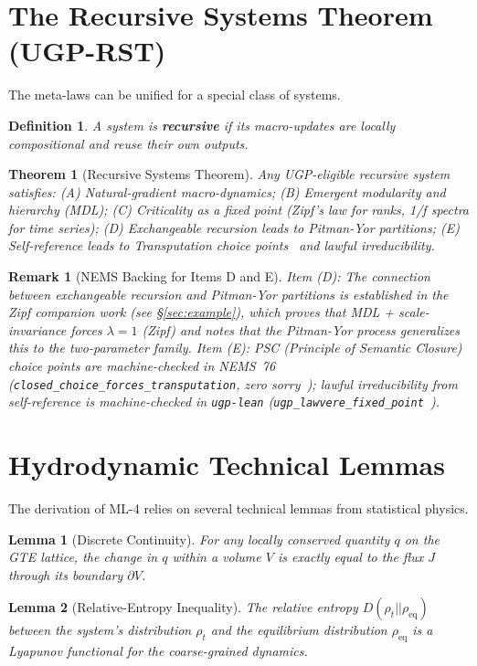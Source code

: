 \documentclass[11pt]{article}
\newtheorem{theorem}{Theorem}[section]
\newtheorem{lemma}{Lemma}[section]
\newtheorem{definition}{Definition}[section]
\newtheorem{remark}{Remark}[section]
\begin{document}
\section{The Recursive Systems Theorem (UGP-RST)}
\label{app:rst}
The meta-laws can be unified for a special class of systems.
\begin{definition}
A system is \textbf{recursive} if its macro-updates are locally compositional and reuse their own outputs.
\end{definition}
\begin{theorem}[Recursive Systems Theorem]
Any UGP-eligible recursive system satisfies: (A) Natural-gradient macro-dynamics; (B) Emergent modularity and hierarchy (MDL); (C) Criticality as a fixed point (Zipf's law for ranks, 1/f spectra for time series); (D) Exchangeable recursion leads to Pitman-Yor partitions; (E) Self-reference leads to Transputation choice points~\cite{SpivackNEMS76} and lawful irreducibility.
\end{theorem}

\begin{remark}[NEMS Backing for Items D and E]
Item (D): The connection between exchangeable recursion and Pitman-Yor partitions is established in the Zipf companion work (see §\ref{sec:example}), which proves that MDL + scale-invariance forces $\lambda=1$ (Zipf) and notes that the Pitman-Yor process generalizes this to the two-parameter family. Item (E): PSC (Principle of Semantic Closure) choice points are machine-checked in NEMS~76 (\texttt{closed\_choice\_forces\_transputation}, zero sorry~\cite{SpivackNEMS76}); lawful irreducibility from self-reference is machine-checked in \texttt{ugp-lean} (\texttt{ugp\_lawvere\_fixed\_point}~\cite{SpivackUGPFormalization,ugp-lean}).
\end{remark}

\section{Hydrodynamic Technical Lemmas}
\label{app:hydro}
The derivation of ML-4 relies on several technical lemmas from statistical physics.
\begin{lemma}[Discrete Continuity]
For any locally conserved quantity $q$ on the GTE lattice, the change in $q$ within a volume $V$ is exactly equal to the flux $J$ through its boundary $\partial V$.
\end{lemma}
\begin{lemma}[Relative-Entropy Inequality]
The relative entropy $D(\rho_t || \rho_{\text{eq}})$ between the system's distribution $\rho_t$ and the equilibrium distribution $\rho_{\text{eq}}$ is a Lyapunov functional for the coarse-grained dynamics.
\end{lemma}
\end{document}
